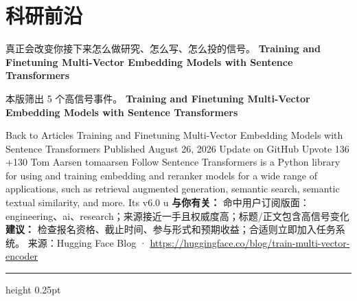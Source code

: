\documentclass[10.5pt]{ctexart}
\begin{document}
\section*{科研前沿}
{\color{ormuted} 真正会改变你接下来怎么做研究、怎么写、怎么投的信号。}
\vspace{2mm}
{\LARGE\bfseries Training and Finetuning Multi-Vector Embedding Models with Sentence Transformers}\par
\vspace{1mm}
{\color{ormuted} 本版筛出 5 个高信号事件。}
\vspace{3mm}
{\Large\bfseries Training and Finetuning Multi-Vector Embedding Models with Sentence Transformers}\par
Back to Articles Training and Finetuning Multi-Vector Embedding Models with Sentence Transformers Published August 26, 2026 Update on GitHub Upvote 136 +130 Tom Aarsen tomaarsen Follow Sentence Transformers is a Python library for using and training embedding and reranker models for a wide range of applications, such as retrieval augmented generation, semantic search, semantic textual similarity, and more. Its v6.0 u
\textbf{与你有关：} 命中用户订阅版面：engineering、ai、research；来源接近一手且权威度高；标题/正文包含高信号变化
\textbf{建议：} 检查报名资格、截止时间、参与形式和预期收益；合适则立即加入任务系统。
{\footnotesize\color{ormuted} 来源：Hugging Face Blog · \url{https://huggingface.co/blog/train-multi-vector-encoder}}
\vspace{4mm}
\hrule height 0.25pt
\vspace{3mm}
\end{document}
